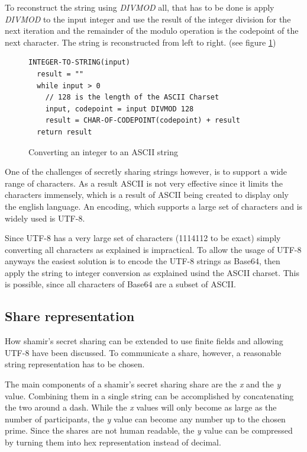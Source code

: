To reconstruct the string using \textit{DIVMOD} all, that has to be done is
apply \textit{DIVMOD} to the input integer and use the result of the integer
division for the next iteration and the remainder of the modulo operation is
the codepoint of the next character. The string is reconstructed from left to
right. (see figure \ref{code:integerToString})

\begin{figure}
\begin{lstlisting}
INTEGER-TO-STRING(input)
  result = ""
  while input > 0
    // 128 is the length of the ASCII Charset
    input, codepoint = input DIVMOD 128
    result = CHAR-OF-CODEPOINT(codepoint) + result
  return result
\end{lstlisting}
\caption{Converting an integer to an ASCII string}
\label{code:integerToString}
\end{figure}

One of the challenges of secretly sharing strings however, is to support a wide
range of characters. As a result ASCII is not very effective since it limits
the characters immensely, which is a result of ASCII being created to display
only the english language. An encoding, which supports a large set of
characters and is widely used is UTF-8.

Since UTF-8 has a very large set of characters (1114112 to be exact) simply
converting all characters as explained is impractical. To allow the usage of
UTF-8 anyways the easiest solution is to encode the UTF-8 strings as Base64,
then apply the string to integer conversion as explained usind the ASCII
charset. This is possible, since all characters of Base64 are a subset of
ASCII.

\subsection{Share representation}

How shamir's secret sharing can be extended to use finite fields and allowing
UTF-8 have been discussed. To communicate a share, however, a reasonable string
representation has to be chosen.

The main components of a shamir's secret sharing share are the \textit{x} and
the \textit{y} value. Combining them in a single string can be accomplished by
concatenating the two around a dash. While the \textit{x} values will only
become as large as the number of participants, the \textit{y} value can become
any number up to the chosen prime. Since the shares are not human readable,
the \textit{y} value can be compressed by turning them into hex representation
instead of decimal.

